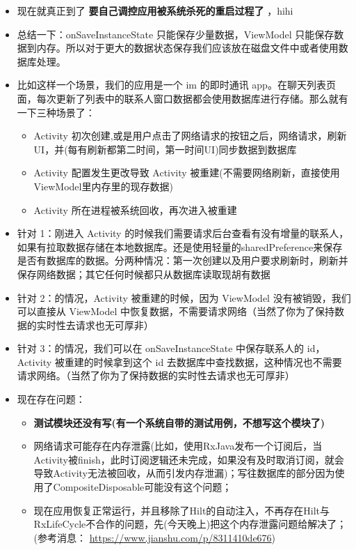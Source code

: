 \documentclass[9pt, b5paper]{article}
\begin{document}
\begin{itemize}
\item 现在就真正到了 \textbf{要自己调控应用被系统杀死的重启过程了} ，hihi
\item 总结一下：onSaveInstanceState 只能保存少量数据，ViewModel 只能保存数据到内存。所以对于更大的数据状态保存我们应该放在磁盘文件中或者使用数据库处理。
\item 比如这样一个场景，我们的应用是一个 im 的即时通讯 app。在聊天列表页面，每次更新了列表中的联系人窗口数据都会使用数据库进行存储。那么就有一下三种场景了：
\begin{itemize}
\item Activity 初次创建,或是用户点击了网络请求的按钮之后，网络请求，刷新UI，并(每有刷新都第二时间，第一时间UI)同步数据到数据库
\item Activity 配置发生更改导致 Activity 被重建(不需要网络刷新，直接使用ViewModel里内存里的现存数据)
\item Activity 所在进程被系统回收，再次进入被重建
\end{itemize}
\item 针对 1：刚进入 Activity 的时候我们需要请求后台查看有没有增量的联系人，如果有拉取数据存储在本地数据库。还是使用轻量的sharedPreference来保存是否有数据库的数据。分两种情况：第一次创建以及用户要求刷新时，刷新并保存网络数据；其它任何时候都只从数据库读取现胡有数据
\item 针对 2：的情况，Activity 被重建的时候，因为 ViewModel 没有被销毁，我们可以直接从 ViewModel 中恢复数据，不需要请求网络（当然了你为了保持数据的实时性去请求也无可厚非）
\item 针对 3：的情况，我们可以在 onSaveInstanceState 中保存联系人的 id，Activity 被重建的时候拿到这个 id 去数据库中查找数据，这种情况也不需要请求网络。（当然了你为了保持数据的实时性去请求也无可厚非）
\item 现在存在问题：
\begin{itemize}
\item \textbf{测试模块还没有写(有一个系统自带的测试用例，不想写这个模块了)}
\item 网络请求可能存在内存泄露(比如，使用RxJava发布一个订阅后，当Activity被finish，此时订阅逻辑还未完成，如果没有及时取消订阅，就会导致Activity无法被回收，从而引发内存泄漏)；写往数据库的部分因为使用了CompositeDisposable可能没有这个问题；
\item 现在应用恢复正常运行，并且移除了Hilt的自动注入，不再存在Hilt与RxLifeCycle不合作的问题，先(今天晚上)把这个内存泄露问题给解决了；(参考消息： \url{https://www.jianshu.com/p/8311410de676})
\begin{itemize}

\end{itemize}
\end{itemize}
\end{itemize}
\end{document}
